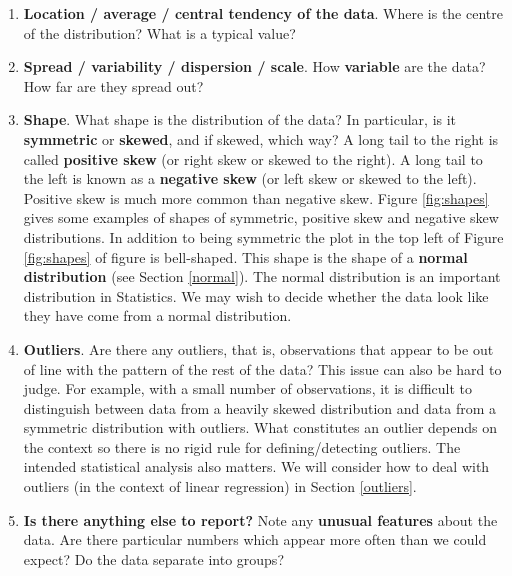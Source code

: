\documentclass[
  british,
]{book}
\providecommand{\tightlist}{%
  \setlength{\itemsep}{0pt}\setlength{\parskip}{0pt}}
\begin{document}
\begin{enumerate}
\def\labelenumi{\arabic{enumi}.}
\tightlist
\item
  \textbf{Location / average / central tendency of the data}. Where is the centre of the distribution? What is a typical value?\\
\item
  \textbf{Spread / variability / dispersion / scale}. How \textbf{variable} are the data? How far are they spread out?
\item
  \textbf{Shape}. What shape is the distribution of the data? In particular, is it \textbf{symmetric} or \textbf{skewed}, and if skewed, which way? A long tail to the right is called \textbf{positive skew} (or right skew or skewed to the right). A long tail to the left is known as a \textbf{negative skew} (or left skew or skewed to the left). Positive skew is much more common than negative skew. Figure \ref{fig:shapes} gives some examples of shapes of symmetric, positive skew and negative skew distributions. In addition to being symmetric the plot in the top left of Figure \ref{fig:shapes} of figure is bell-shaped. This shape is the shape of a \textbf{normal distribution} (see Section \ref{normal}). The normal distribution is an important distribution in Statistics. We may wish to decide whether the data look like they have come from a normal distribution.
\item
  \textbf{Outliers}. Are there any outliers, that is, observations that appear to be out of line with the pattern of the rest of the data? This issue can also be hard to judge. For example, with a small number of observations, it is difficult to distinguish between data from a heavily skewed distribution and data from a symmetric distribution with outliers. What constitutes an outlier depends on the context so there is no rigid rule for defining/detecting outliers. The intended statistical analysis also matters. We will consider how to deal with outliers (in the context of linear regression) in Section \ref{outliers}.
\item
  \textbf{Is there anything else to report?} Note any \textbf{unusual features}
  about the data. Are there particular numbers which appear more often than we could expect? Do the data separate into groups?
\end{enumerate}
\end{document}
